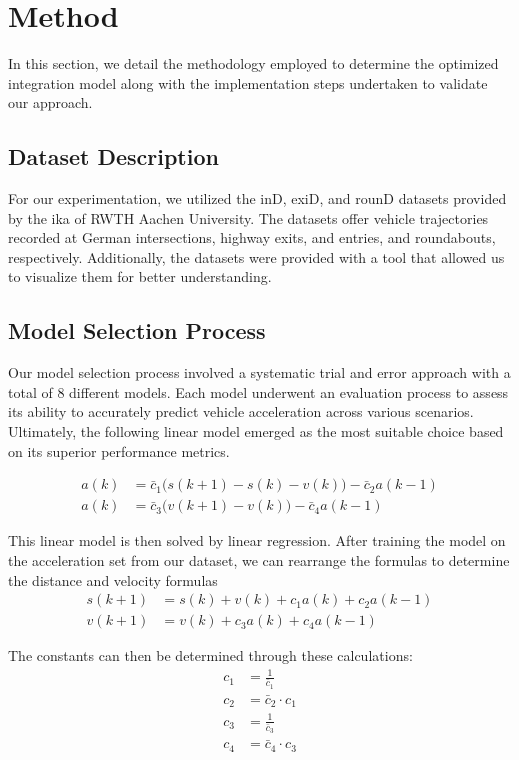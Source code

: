 \section{Method}

In this section, we detail the methodology employed to determine the optimized integration model
along with the implementation steps undertaken to validate our approach.

\subsection{Dataset Description} 
For our experimentation, we utilized the inD, exiD, and rounD datasets provided by the ika 
of RWTH Aachen University.
The datasets offer vehicle trajectories recorded at German intersections, highway exits, and entries, 
and roundabouts, respectively. 
Additionally, the datasets were provided with a tool that allowed us to visualize them for better understanding. 

\subsection{Model Selection Process} 
Our model selection process involved a systematic trial and error approach with a total of 8 different models. 
Each model underwent an evaluation process to assess its ability to accurately predict vehicle acceleration across 
various scenarios. 
Ultimately, the following linear model emerged as the most suitable choice based on its superior performance metrics.

\begin{align}
    a(k) &= \bar{c}_1 \bigl( s(k+1) - s(k) - v(k) \bigr) -\bar{c}_2 a(k-1) \\
    a(k) &= \bar{c}_3 \bigl( v(k+1) - v(k) \bigr) -\bar{c}_4 a(k-1) 
\end{align}

This linear model is then solved by linear regression. 
After training the model on the acceleration set from our dataset, we can rearrange the formulas
to determine the distance and velocity formulas
\begin{align}
    s(k+1) &= s(k) + v(k)+ c_1 a(k) + c_2 a(k-1) \\
    v(k+1) &= v(k) +                c_3 a(k) + c_4 a(k-1)
\end{align}


The constants can then be determined through these calculations:
\begin{align}
   c_1 &= \frac{1}{\bar{c}_1} \\
   c_2 &= \bar{c}_2 \cdot c_1 \\
   c_3 &= \frac{1}{\bar{c}_3} \\
   c_4 &= \bar{c}_4 \cdot c_3
\end{align}

